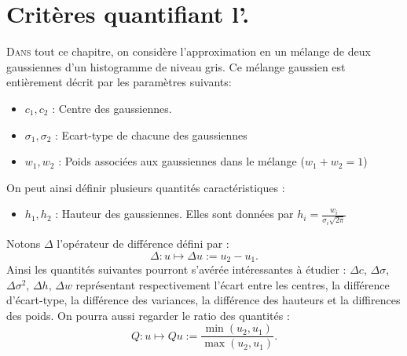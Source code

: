 \documentclass[main.tex]{subfiles}
\begin{document}



\chapter{Critères quantifiant l'\hetero.}
\lettrine[lines=2, lhang=0.33, loversize=0.25]{D}{ans} 
tout ce chapitre, on considère l'approximation en un mélange de deux  gaussiennes d'un histogramme de niveau gris. Ce mélange gaussien est entièrement décrit par les paramètres suivants:
\begin{itemize}
\item $c_1, c_2$ : Centre des gaussiennes.
\item $\sigma_1,\sigma_2$ : Ecart-type de chacune des gaussiennes
\item $w_1,w_2$ : Poids associées aux gaussiennes dans le mélange ($w_1+w_2=1$)
\end{itemize}
On peut ainsi définir plusieurs quantités caractéristiques :
\begin{itemize}
\item $h_1,h_2$ : Hauteur des gaussiennes. Elles sont données par $h_i = \frac{w_i}{\sigma_i\sqrt{2\pi}}$
\end{itemize}
Notons $\Delta$ l'opérateur de différence défini par :
\begin{equation}
\label{eq:operateur_delta_gaussienne}
\Delta :  u \longmapsto \Delta u := u_2 - u_1.
\end{equation}
Ainsi les quantités suivantes pourront s'avérée intéressantes à étudier : $\Delta c$, $\Delta \sigma$,  $\Delta \sigma^2$, $\Delta h$, $\Delta w$ représentant respectivement l'écart entre les centres, la différence d'écart-type, la différence des variances, la différence des hauteurs et la diffirences des poids. On pourra aussi regarder le ratio des quantités :
\begin{equation}
\label{eq:operateur_quotient_gaussienne}
Q :  u \longmapsto Qu := \dfrac{ \min( u_2 , u_1) }{ \max( u_2 , u_1)  }.
\end{equation}
\end{document}
